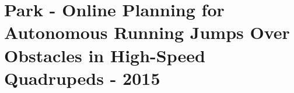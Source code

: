 \section{Park - Online Planning for Autonomous Running Jumps
Over Obstacles in High-Speed Quadrupeds \cite{Wensing2015} - 2015}
